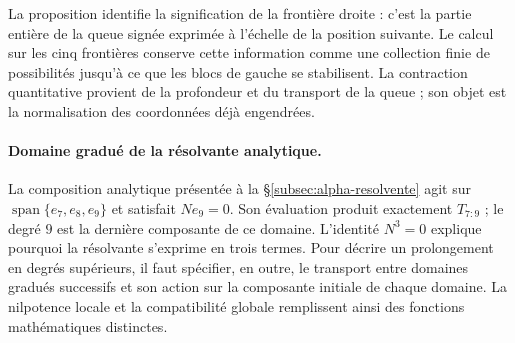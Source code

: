 La proposition identifie la signification de la frontière droite : c'est la
partie entière de la queue signée exprimée à l'échelle de la position
suivante. Le calcul sur les cinq frontières conserve cette information
comme une collection finie de possibilités jusqu'à ce que les blocs de
gauche se stabilisent. La contraction quantitative provient de la
profondeur et du transport de la queue ; son objet est la normalisation des
coordonnées déjà engendrées.

\paragraph{Domaine gradué de la résolvante analytique.}
\label{ampl-alfa-dominio-resolvente}
La composition analytique présentée à la
\S\ref{subsec:alpha-resolvente} agit sur
$\operatorname{span}\{e_7,e_8,e_9\}$ et satisfait $Ne_9=0$. Son
évaluation produit exactement $T_{7:9}$ ; le degré $9$ est la dernière
composante de ce domaine. L'identité $N^3=0$ explique pourquoi la
résolvante s'exprime en trois termes. Pour décrire un
prolongement en degrés supérieurs, il faut spécifier, en outre, le
transport entre domaines gradués successifs et son action sur la
composante initiale de chaque domaine. La nilpotence locale et la
compatibilité globale remplissent ainsi des fonctions mathématiques distinctes.
